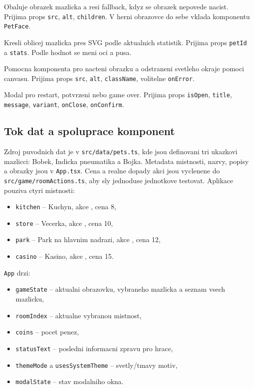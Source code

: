 \documentclass[12pt,a4paper]{article}
\begin{document}
\begin{description}[style=nextline]
  \item[\texttt{PetAvatar}] Obaluje obrazek mazlicka a resi fallback, kdyz se obrazek nepovede nacist. Prijima props \texttt{src}, \texttt{alt}, \texttt{children}. V herni obrazovce do sebe vklada komponentu \texttt{PetFace}.

  \item[\texttt{PetFace}] Kresli oblicej mazlicka pres SVG podle aktualnich statistik. Prijima props \texttt{petId} a \texttt{stats}. Podle hodnot se meni oci a pusa.

  \item[\texttt{CutoutImage}] Pomocna komponenta pro nacteni obrazku a odstraneni svetleho okraje pomoci canvasu. Prijima props \texttt{src}, \texttt{alt}, \texttt{className}, volitelne \texttt{onError}.

  \item[\texttt{StatusModal}] Modal pro restart, potvrzeni nebo game over. Prijima props \texttt{isOpen}, \texttt{title}, \texttt{message}, \texttt{variant}, \texttt{onClose}, \texttt{onConfirm}.
\end{description}

\subsection*{Tok dat a spoluprace komponent}

Zdroj puvodnich dat je v \texttt{src/data/pets.ts}, kde jsou definovani tri ukazkovi mazlicci: Bobek, Indicka pneumatika a Bojka. Metadata mistnosti, nazvy, popisy a obrazky jsou v \texttt{App.tsx}. Cena a realne dopady akci jsou vyclenene do \texttt{src/game/roomActions.ts}, aby sly jednoduse jednotkove testovat. Aplikace pouziva ctyri mistnosti:
\begin{itemize}[leftmargin=2em]
  \item \texttt{kitchen} -- Kuchyn, akce , cena 8,
  \item \texttt{store} -- Vecerka, akce , cena 10,
  \item \texttt{park} -- Park na hlavnim nadrazi, akce , cena 12,
  \item \texttt{casino} -- Kasino, akce , cena 15.
\end{itemize}

\texttt{App} drzi:
\begin{itemize}[leftmargin=2em]
  \item \texttt{gameState} -- aktualni obrazovku, vybraneho mazlicka a seznam vsech mazlicku,
  \item \texttt{roomIndex} -- aktualne vybranou mistnost,
  \item \texttt{coins} -- pocet penez,
  \item \texttt{statusText} -- posledni informacni zpravu pro hrace,
  \item \texttt{themeMode} a \texttt{usesSystemTheme} -- svetly/tmavy motiv,
  \item \texttt{modalState} -- stav modalniho okna.
\end{itemize}
\end{document}
